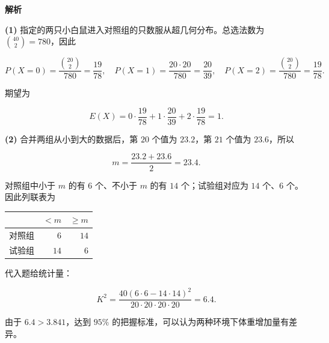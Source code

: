 \begin{answer}
\textbf{解析}

\textbf{(1)} 指定的两只小白鼠进入对照组的只数服从超几何分布。总选法数为 $\binom{40}{2}=780$，因此

\nopagebreak[4]
\[
P(X=0)=\frac{\binom{20}{2}}{780}=\frac{19}{78},\quad
P(X=1)=\frac{20\cdot20}{780}=\frac{20}{39},\quad
P(X=2)=\frac{\binom{20}{2}}{780}=\frac{19}{78}.
\]

期望为

\nopagebreak[4]
\[
E(X)=0\cdot\frac{19}{78}+1\cdot\frac{20}{39}+2\cdot\frac{19}{78}=1.
\]

\textbf{(2)} 合并两组从小到大的数据后，第 $20$ 个值为 $23.2$，第 $21$ 个值为 $23.6$，所以

\nopagebreak[4]
\[
m=\frac{23.2+23.6}{2}=23.4.
\]

对照组中小于 $m$ 的有 $6$ 个、不小于 $m$ 的有 $14$ 个；试验组对应为 $14$ 个、$6$ 个。因此列联表为

\begin{center}
\begin{tabular}{crr}
\toprule
 & $<m$ & $\geqslant m$ \\
\midrule
对照组 & $6$ & $14$ \\
试验组 & $14$ & $6$ \\
\bottomrule
\end{tabular}
\end{center}

代入题给统计量：

\nopagebreak[4]
\[
K^2=\frac{40(6\cdot6-14\cdot14)^2}{20\cdot20\cdot20\cdot20}=6.4.
\]

由于 $6.4>3.841$，达到 $95\%$ 的把握标准，可以认为两种环境下体重增加量有差异。



\end{answer}
